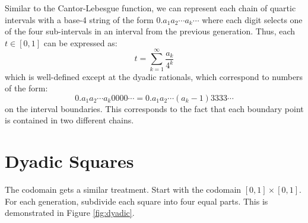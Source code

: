 \documentclass[letterpaper,12pt,fleqn,reqno]{amsart}
\newcommand{\uint}{[0,1]}
\newcommand{\usq}{\uint\times\uint}
\theoremstyle{plain}
\begin{document}
Similar to the Cantor-Lebesgue function, we can represent each chain of quartic
intervals with a base-4 string of the form $0.a_1a_2\cdots a_k\cdots$ where
each digit selects one of the four sub-intervals in an interval from the
previous generation.  Thus, each $t\in\uint$ can be expressed as:
\begin{equation}
t=\sum_{k=1}^{\infty}\frac{a_k}{4^k}
\label{eqn:quartic}
\end{equation}
which is well-defined except at the dyadic rationals, which correspond to
numbers of the form:
\[0.a_1a_2\cdots a_k0000\cdots=0.a_1a_2\cdots (a_k-1)3333\cdots\]
on the interval boundaries. This corresponds to the fact that each boundary
point is contained in two different chains.

\section{Dyadic Squares}
The codomain gets a similar treatment. Start with the codomain $\usq$. For each
generation, subdivide each square into four equal parts. This is demonstrated
in Figure \ref{fig:dyadic}.
\end{document}
